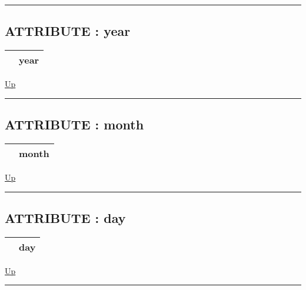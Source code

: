 \rule{\textwidth}{0.4pt}

\subsection*{ATTRIBUTE : year}
\hypertarget{ecldoc:date.togregorianymd.result.year}{}

{\renewcommand{\arraystretch}{1.5}
\begin{tabularx}{\textwidth}{|>{\raggedright\arraybackslash}l|X|}
\hline
\hspace{0pt} & year \\
\hline
\end{tabularx}
}

\hyperlink{ecldoc:date.togregorianymd}{Up}

\par


\rule{\textwidth}{0.4pt}
\subsection*{ATTRIBUTE : month}
\hypertarget{ecldoc:date.togregorianymd.result.month}{}

{\renewcommand{\arraystretch}{1.5}
\begin{tabularx}{\textwidth}{|>{\raggedright\arraybackslash}l|X|}
\hline
\hspace{0pt} & month \\
\hline
\end{tabularx}
}

\hyperlink{ecldoc:date.togregorianymd}{Up}

\par


\rule{\textwidth}{0.4pt}
\subsection*{ATTRIBUTE : day}
\hypertarget{ecldoc:date.togregorianymd.result.day}{}

{\renewcommand{\arraystretch}{1.5}
\begin{tabularx}{\textwidth}{|>{\raggedright\arraybackslash}l|X|}
\hline
\hspace{0pt} & day \\
\hline
\end{tabularx}
}

\hyperlink{ecldoc:date.togregorianymd}{Up}

\par


\rule{\textwidth}{0.4pt}


